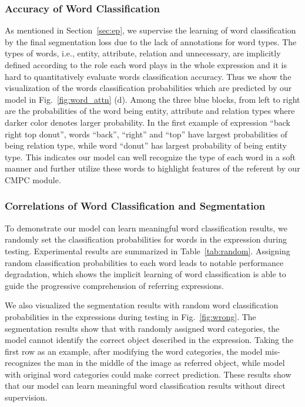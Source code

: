 \documentclass[10pt,journal,cspaper,compsoc]{IEEEtran}
\begin{document}
\subsubsection{Accuracy of Word Classification}
As mentioned in Section~\ref{sec:ep}, we supervise the learning of word classification by the final segmentation loss due to the lack of annotations for word types.
The  types of words, i.e., entity, attribute, relation and unnecessary, are implicitly defined according to the role each word plays in the whole expression and it is hard to quantitatively evaluate words classification accuracy. 
Thus we show the visualization of the words classification probabilities which are predicted by our model in Fig.~\ref{fig:word_attn} (d).
Among the three blue blocks, from left to right are the probabilities of the word being entity, attribute and relation types where darker color denotes larger probability. 
In the first example of expression “back right top donut”, words “back”, “right” and “top” have largest probabilities of being relation type, while word “donut” has largest probability of being entity type. 
This indicates our model can well recognize the type of each word in a soft manner and further utilize these words to highlight features of the referent by our CMPC module.

\subsubsection{Correlations of Word Classification and Segmentation}
To demonstrate our model can learn meaningful word classification results, 
we randomly set the classification probabilities for words in the expression during testing.
Experimental results are summarized in Table~\ref{tab:random}. 
Assigning random classification probabilities to each word leads to notable performance degradation, 
which shows the implicit learning of word classification is able to guide the progressive comprehension of referring expressions.

We also visualized the segmentation results with random word classification probabilities in the expressions during testing in Fig.~\ref{fig:wrong}. 
The segmentation results show that with randomly assigned word categories, the model cannot identify the correct object described in the expression. 
Taking the first row as an example, after modifying the word categories, the model mis-recognizes the man in the middle of the image as referred object, 
while model with original word categories could make correct prediction. 
These results show that our model can learn meaningful word classification results without direct supervision.
\end{document}
